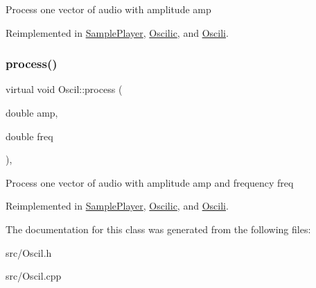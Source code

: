 Process one vector of audio with amplitude amp 

Reimplemented in \hyperlink{class_sample_player_a806595c5e7674717d52bb8a57f451c0b}{Sample\+Player}, \hyperlink{class_oscilic_ad97eaf877abdd40fc06499198eb3d9bc}{Oscilic}, and \hyperlink{class_oscili_a1fb47dff09f771481e1a1d2fde39d775}{Oscili}.

\mbox{\label{class_oscil_abca4352d264fd66538502c72c2440784}} 
\subsubsection{\texorpdfstring{process()}{process()}\hspace{0.1cm}{\footnotesize\ttfamily [3/3]}}
{\footnotesize\ttfamily virtual void Oscil\+::process (\begin{DoxyParamCaption}\item[{double}]{amp,  }\item[{double}]{freq }\end{DoxyParamCaption})\hspace{0.3cm}{\ttfamily [inline]}, {\ttfamily [virtual]}}

Process one vector of audio with amplitude amp and frequency freq 

Reimplemented in \hyperlink{class_sample_player_a01fc7c2fdfd29c0c178e288d5aa06acc}{Sample\+Player}, \hyperlink{class_oscilic_acce96320f114bbd74114ef87e39660aa}{Oscilic}, and \hyperlink{class_oscili_a053ace3b633b645c4b8a517009ea7389}{Oscili}.



The documentation for this class was generated from the following files\+:\begin{DoxyCompactItemize}
\item 
src/Oscil.\+h\item 
src/Oscil.\+cpp\end{DoxyCompactItemize}
